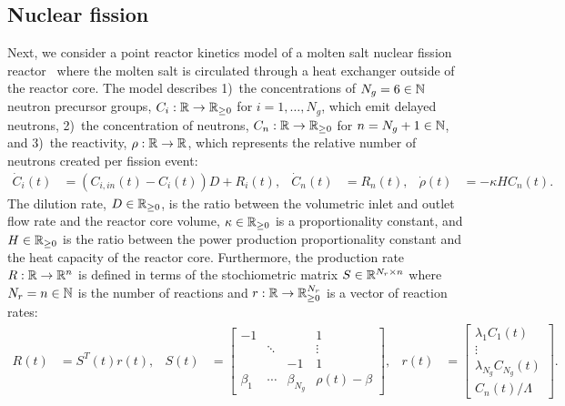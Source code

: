 \subsection{Nuclear fission}\label{sec:ex:nuclear:fission}
Next, we consider a point reactor kinetics model of a molten salt nuclear fission reactor~\cite{Duderstadt:Hamilton:1976, Wooten:Powers:2018} where the molten salt is circulated through a heat exchanger outside of the reactor core. The model describes 1)~the concentrations of $N_g = 6 \in \mathbb{N}$ neutron precursor groups, $C_i: \mathbb{R} \rightarrow \mathbb{R}_{\geq 0}$ for $i = 1, \ldots, N_g$, which emit delayed neutrons, 2)~the concentration of neutrons, $C_n: \mathbb{R} \rightarrow \mathbb{R}_{\geq 0}$ for $n = N_g + 1 \in \mathbb{N}$, and 3)~the reactivity, $\rho: \mathbb{R} \rightarrow \mathbb{R}$, which represents the relative number of neutrons created per fission event:
%
\begin{subequations}
	\begin{align}
		\dot C_i(t) &= (C_{i, in}(t) - C_i(t)) D + R_i(t), &
		\dot C_n(t) &= R_n(t), &
		\dot \rho(t) &= -\kappa H C_n(t).
	\end{align}
\end{subequations}
%
The dilution rate, $D \in \mathbb{R}_{\geq 0}$, is the ratio between the volumetric inlet and outlet flow rate and the reactor core volume, $\kappa \in \mathbb{R}_{\geq 0}$ is a proportionality constant, and $H \in \mathbb{R}_{\geq 0}$ is the ratio between the power production proportionality constant and the heat capacity of the reactor core. Furthermore, the production rate $R: \mathbb{R} \rightarrow \mathbb{R}^n$ is defined in terms of the stochiometric matrix $S \in \mathbb{R}^{N_r \times n}$ where $N_r = n \in \mathbb{N}$ is the number of reactions and $r: \mathbb{R} \rightarrow \mathbb{R}_{\geq 0}^{N_r}$ is a vector of reaction rates:
%
\begin{align}
	R(t) &= S^T(t) r(t), &
	S(t) &=
	\begin{bmatrix}
		-1      &         &             & 1               \\
		&  \ddots &             & \vdots          \\
		&         & -1          & 1               \\
		\beta_1 & \cdots  & \beta_{N_g} & \rho(t) - \beta
	\end{bmatrix}, &
	r(t) &=
	\begin{bmatrix}
		\lambda_1 C_1(t) \\ \vdots \\ \lambda_{N_g} C_{N_g}(t) \\ C_n(t)/\Lambda
	\end{bmatrix}.
\end{align}
